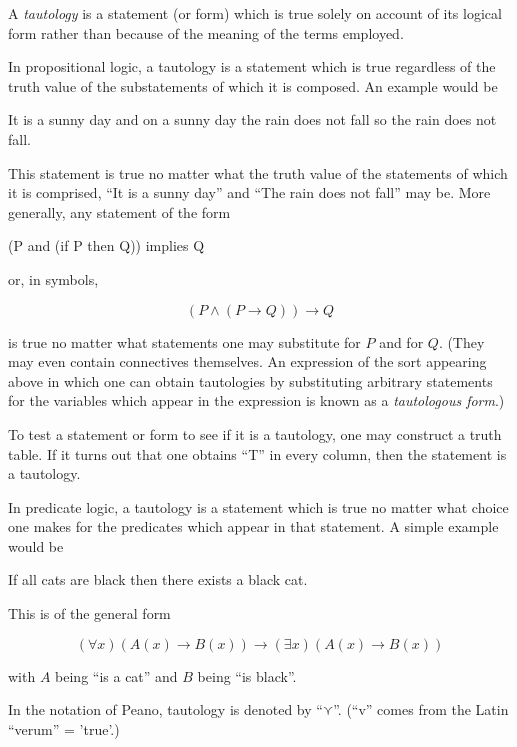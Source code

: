 \documentclass[12pt]{article}
\begin{document}

A \emph{tautology} is a statement (or form) which is true solely on account of its logical form rather than because of the meaning of the terms employed.

In propositional logic, a tautology is a statement which is true regardless of the truth value of the substatements of which it is composed.  An example would be

It is a sunny day and on a sunny day the rain does not fall so the rain does not fall.

This statement is true no matter what the truth value of the statements of which it is comprised, ``It is a sunny day'' and ``The rain does not fall'' may be.  More generally, any statement of the form

(P and (if P then Q)) implies Q

or, in symbols,

\[ (P \wedge (P \rightarrow Q)) \rightarrow Q \]

is true no matter what statements one may substitute for $P$ and for $Q$.  (They may even contain connectives themselves.  An expression of the sort appearing above in which one can obtain tautologies by substituting arbitrary statements for the variables which appear in the expression is known as a \emph{tautologous form}.) 

To test a statement or form to see if it is a tautology, one may construct a truth table.  If it turns out that one obtains ``T'' in every column, then the statement is a tautology.

In predicate logic, a tautology is a statement which is true no matter what choice one makes for the predicates which appear in that statement.  A simple example would be

If all cats are black then there exists a black cat.

This is of the general form

\[ (\forall x) (A(x) \rightarrow B(x)) \rightarrow (\exists x) (A(x) \rightarrow B(x)) \]

with $A$ being ``is a cat'' and $B$ being ``is black''.

In the notation of Peano, tautology is denoted by ``$\curlyvee$''.  (``v'' 
comes from the Latin ``verum'' = 'true'.)
\end{document}

